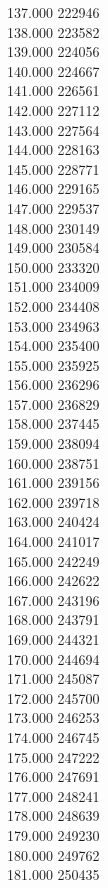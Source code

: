 { 137.000	222946 \\
 138.000	223582 \\
 139.000	224056 \\
 140.000	224667 \\
 141.000	226561 \\
 142.000	227112 \\
 143.000	227564 \\
 144.000	228163 \\
 145.000	228771 \\
 146.000	229165 \\
 147.000	229537 \\
 148.000	230149 \\
 149.000	230584 \\
 150.000	233320 \\
 151.000	234009 \\
 152.000	234408 \\
 153.000	234963 \\
 154.000	235400 \\
 155.000	235925 \\
 156.000	236296 \\
 157.000	236829 \\
 158.000	237445 \\
 159.000	238094 \\
 160.000	238751 \\
 161.000	239156 \\
 162.000	239718 \\
 163.000	240424 \\
 164.000	241017 \\
 165.000	242249 \\
 166.000	242622 \\
 167.000	243196 \\
 168.000	243791 \\
 169.000	244321 \\
 170.000	244694 \\
 171.000	245087 \\
 172.000	245700 \\
 173.000	246253 \\
 174.000	246745 \\
 175.000	247222 \\
 176.000	247691 \\
 177.000	248241 \\
 178.000	248639 \\
 179.000	249230 \\
 180.000	249762 \\
 181.000	250435 \\
}
